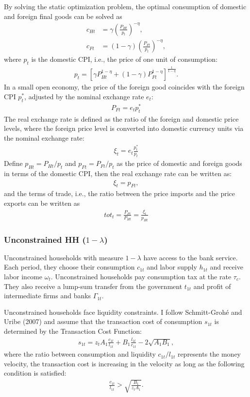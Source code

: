 \documentclass[12pt]{article}
\begin{document}
By solving the static optimization problem, the optimal consumption of domestic and foreign final goods can be solved as 
\begin{align*}
c_{Ht} &= \gamma(\frac{P_{Ht}}{p_t})^{-\eta}, \\
c_{Ft} &= (1-\gamma)(\frac{P_{Ft}}{p_t})^{-\eta}, 
\end{align*}
where $p_t$ is the domestic CPI, i.e., the price of one unit of consumption: 
\begin{align*}
p_t = [\gamma P_{Ht}^{1-\eta}+(1-\gamma)P_{Ft}^{1-\eta}]^{\frac{1}{1-\eta}}.
\end{align*}
In a small open economy, the price of the foreign good coincides with the foreign CPI $p_t^*$, adjusted by the nominal exchange rate $e_t$:
\begin{align*}
P_{Ft} = e_tp_t^*
\end{align*}
The real exchange rate is defined as the ratio of the foreign and domestic price levels, where the foreign price level is converted into domestic currency units via the nominal exchange rate: 
\begin{align*}
\xi_t = e_t \frac{p_t^*}{p_t}
\end{align*}
Define $p_{Ht} = P_{Ht}/p_t$ and  $p_{Ft} = P_{Ft}/p_t$ as the price of domestic and foreign goods in terms of the domestic CPI, then the real exchange rate can be written as: 
\begin{align*}
\xi_t = p_{Ft}, 
\end{align*}
and the terms of trade, i.e., the ratio between the price imports and the price exports can be written as 
\begin{align*}
tot_t = \frac{P_{Ft}}{P_{Ht}} = \frac{\xi_t}{p_{Ht}}
\end{align*}

\subsubsection*{Unconstrained HH ($1-\lambda$)} 
Unconstrained households with measure $1-\lambda$ have access to the bank service. Each period, they choose their consumption $c_{1t}$ and labor supply $h_{1t}$ and receive labor income $\omega_t$. Unconstrained households pay consumption tax at the rate $\tau_c$. They also receive a lump-sum transfer from the government $t_{1t}$ and profit of intermediate firms and banks $\Gamma_{1t}$.

Unconstrained households face liquidity constraints. I follow Schmitt-Groh{\'e} and Uribe (2007) and assume that the transaction cost of consumption $s_{1t}$ is determined by the Transaction Cost Function:
\begin{align*}
s_{1t} = z_tA_1\frac{c_{1t}}{l_{1t}}+B_1\frac{l_{1t}}{c_{1t}}-2\sqrt{A_1B_1},
\end{align*}
where the ratio between consumption and liquidity $c_{1t}/l_{1t}$ represents the money velocity, the transaction cost is increasing in the velocity as long as the following condition is satisfied:  
\begin{align*}
\frac{c_{1t}}{l_{1t}}>\sqrt{\frac{B_1}{z_tA_1}}.
\end{align*} 
\end{document}
